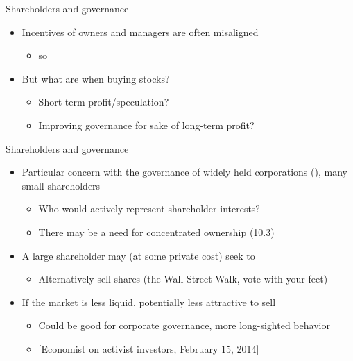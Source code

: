 \documentclass[english,10pt
,aspectratio=169
]{beamer}
\begin{document}
\begin{frame}{Shareholders and governance}
	\begin{itemize}
		\item Incentives of owners and managers are often misaligned
		\begin{itemize}
			\item so 
		\end{itemize}
		\item But what are  when buying stocks?
		\begin{itemize}
			\item Short-term profit/speculation?
			\item Improving governance for sake of long-term profit?
		\end{itemize}
	\end{itemize}
\end{frame}


\begin{frame}{Shareholders and governance}
	\begin{itemize}
		\item Particular concern with the governance of widely held corporations (\cite{berle_modern_1932}), many small shareholders
		\begin{itemize}
			\item Who would actively represent shareholder interests?
			\item There may be a need for concentrated ownership (10.3)
		\end{itemize}
		\item A large shareholder may (at some private cost) seek to 
		\begin{itemize}
			\item Alternatively sell shares (the Wall Street Walk, vote with your feet)
		\end{itemize}
		\item If the market is less liquid, potentially less attractive to sell
		\begin{itemize}
			\item Could be good for corporate governance, more long-sighted behavior
			\item $[$Economist on activist investors, February 15, 2014]
		\end{itemize}
	\end{itemize}
\end{frame}
\end{document}
